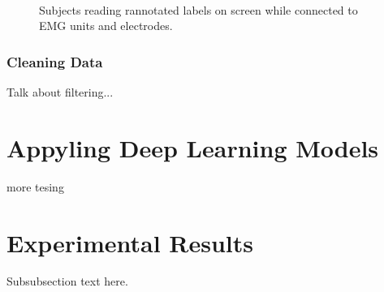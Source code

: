 \documentclass[conference]{IEEEtran}
\begin{document}
\begin{figure} 
    \centering
    \\
  \caption{Subjects reading rannotated labels on screen while connected to EMG units and electrodes.}
  \label{fig: conn-ann} 
\end{figure}

\subsubsection*{Cleaning Data}
Talk about filtering... 


\section{Appyling Deep Learning Models}
more tesing 

\section{Experimental Results}
Subsubsection text here.
\end{document}
